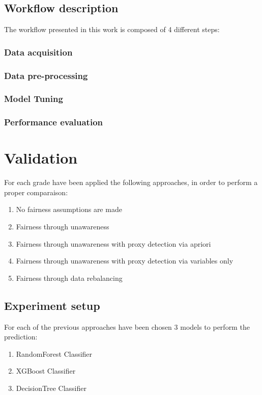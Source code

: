 \documentclass[12pt,a4paper,openright,twoside]{book}
\begin{document}
\section{Workflow description}
The workflow presented in this work is composed of 4 different steps:
\subsection{Data acquisition}
\subsection{Data pre-processing}
\subsection{Model Tuning}
\subsection{Performance evaluation}
\chapter{Validation} %
\label{chap:validation}
For each grade have been applied the following approaches, in order to perform a proper comparaison:
\begin{enumerate}
    \item No fairness assumptions are made
    \item Fairness through unawareness
    \item Fairness through unawareness with proxy detection via apriori
    \item Fairness through unawareness with proxy detection via variables only
    \item Fairness through data rebalancing
\end{enumerate}

\section{Experiment setup}
For each of the previous approaches have been chosen 3 models to perform the prediction:
\begin{enumerate}
    \item RandomForest Classifier
    \item XGBoost Classifier
    \item DecisionTree Classifier
\end{enumerate}
\end{document}
